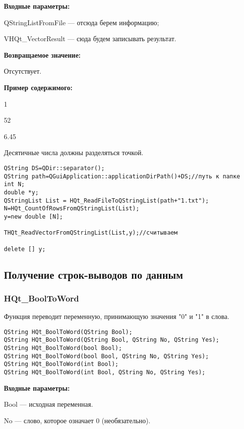 \documentclass[a4paper,12pt]{article}
\begin{document}
\textbf{Входные параметры:}

QStringListFromFile --- отсюда берем информацию;

     VHQt\_VectorResult --- сюда будем записывать результат.

\textbf{Возвращаемое значение:}

Отсутствует.

\textbf{Пример содержимого:}

1

52

6.45

Десятичные числа должны разделяться точкой.


\begin{lstlisting}[label=code_use_THQt_ReadVectorFromQStringList,caption=Пример использования]
QString DS=QDir::separator();
QString path=QGuiApplication::applicationDirPath()+DS;//путь к папке
int N;
double *y;
QStringList List = HQt_ReadFileToQStringList(path+"1.txt");
N=HQt_CountOfRowsFromQStringList(List);
y=new double [N];

THQt_ReadVectorFromQStringList(List,y);//считываем

delete [] y;
\end{lstlisting}

\subsection{Получение строк-выводов по данным}

\subsubsection{HQt\_BoolToWord}\label{HQt_BoolToWord}

Функция переводит переменную, принимающую значения "0" и "1" в слова.


\begin{lstlisting}[label=code_syntax_HQt_BoolToWord,caption=Синтаксис]
QString HQt_BoolToWord(QString Bool);
QString HQt_BoolToWord(QString Bool, QString No, QString Yes);
QString HQt_BoolToWord(bool Bool);
QString HQt_BoolToWord(bool Bool, QString No, QString Yes);
QString HQt_BoolToWord(int Bool);
QString HQt_BoolToWord(int Bool, QString No, QString Yes);
\end{lstlisting}

\textbf{Входные параметры:}

Bool --- исходная переменная.
 
No --- слово, которое означает 0 (необязательно).
 
\end{document}
